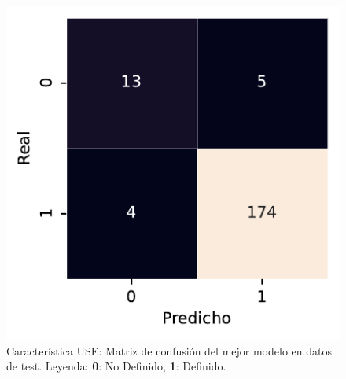 \begin{figure}[htbp]
    \vspace{1.5em} %

    \includegraphics[width=0.6\linewidth]{figures/5_experiments/multi-use-cm.pdf}
    \caption[Característica USE: Matriz de confusión del mejor modelo en datos de test.]{Característica USE: Matriz de confusión del mejor modelo en datos de test. Leyenda: \textbf{0}: No Definido, \textbf{1}: Definido.}
    \label{fig5:USE_confusion_matrix}
\end{figure}

